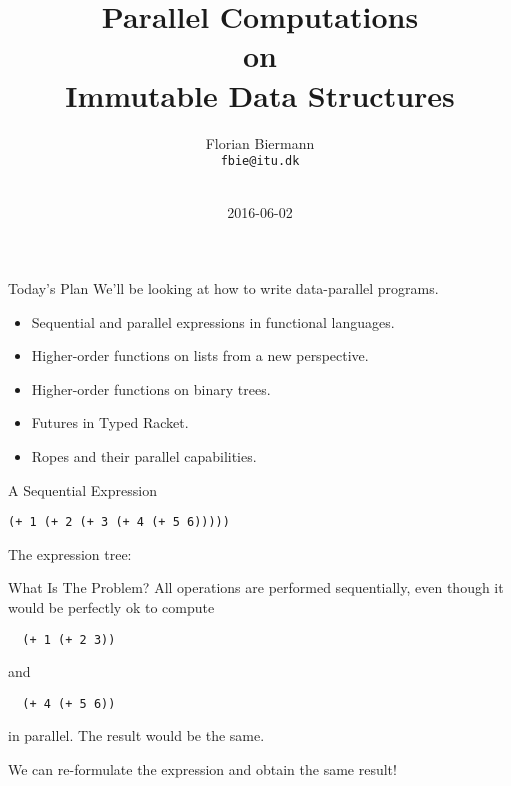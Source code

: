 \documentclass{beamer}
\title{Parallel Computations\\ on\\ Immutable Data Structures}
\author{Florian Biermann \\\small{\texttt{fbie@itu.dk}} \\~}
\institute{IT University of Copenhagen \& UCAS}
\date{2016-06-02}
\begin{document}
\begin{frame}
  \titlepage{}
\end{frame}

\begin{frame}{Today's Plan}
  We'll be looking at how to write data-parallel programs.
  \begin{itemize}
  \pause{} \item Sequential and parallel expressions in functional languages.
  \pause{} \item Higher-order functions on lists from a new perspective.
  \pause{} \item Higher-order functions on binary trees.
  \pause{} \item Futures in Typed Racket.
  \pause{} \item Ropes and their parallel capabilities.
  \end{itemize}
\end{frame}

\begin{frame}[fragile]{A Sequential Expression}
  \begin{center}
    \lstinline{(+ 1 (+ 2 (+ 3 (+ 4 (+ 5 6)))))}
  \end{center}

  \pause{} \vspace{.5cm}

  The expression tree:

  \begin{center}
  \end{center}
\end{frame}

\begin{frame}[fragile]{What Is The Problem?}
All operations are performed sequentially, even though it would be perfectly ok to compute

\begin{lstlisting}
  (+ 1 (+ 2 3))
\end{lstlisting}

and

\begin{lstlisting}
  (+ 4 (+ 5 6))
\end{lstlisting}

in parallel. The result would be the same.

\pause{} \vspace{1cm}

We can re-formulate the expression and obtain the same result!
\end{frame}
\end{document}
